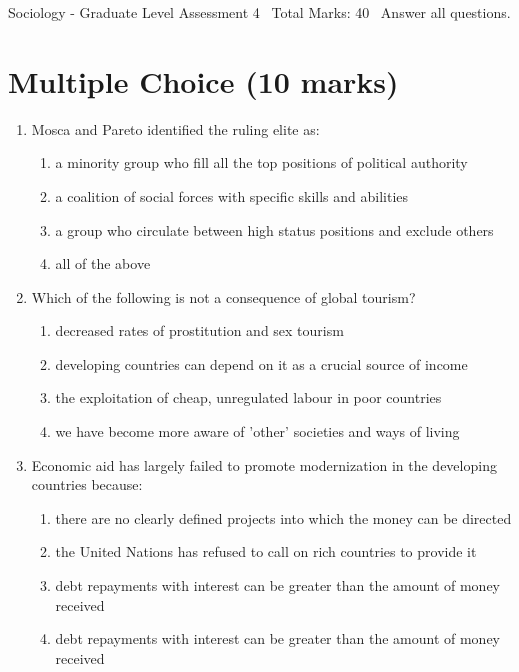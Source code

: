 \documentclass[12pt]{article}
\begin{document}
\begin{center}
Sociology - Graduate Level Assessment 4 \
Total Marks: 40 \
Answer all questions.
\end{center}

\section*{Multiple Choice (10 marks)}
\begin{enumerate}[label=\arabic*.]
\item Mosca and Pareto identified the ruling elite as:
\begin{enumerate}[label=(\alph*)]
    \item a minority group who fill all the top positions of political authority
    \item a coalition of social forces with specific skills and abilities
    \item a group who circulate between high status positions and exclude others
    \item all of the above
\end{enumerate}
\item Which of the following is not a consequence of global tourism?
\begin{enumerate}[label=(\alph*)]
    \item decreased rates of prostitution and sex tourism
    \item developing countries can depend on it as a crucial source of income
    \item the exploitation of cheap, unregulated labour in poor countries
    \item we have become more aware of 'other' societies and ways of living
\end{enumerate}
\item Economic aid has largely failed to promote modernization in the developing countries because:
\begin{enumerate}[label=(\alph*)]
    \item there are no clearly defined projects into which the money can be directed
    \item the United Nations has refused to call on rich countries to provide it
    \item debt repayments with interest can be greater than the amount of money received
    \item debt repayments with interest can be greater than the amount of money received
\end{enumerate}

\end{enumerate}
\end{document}
